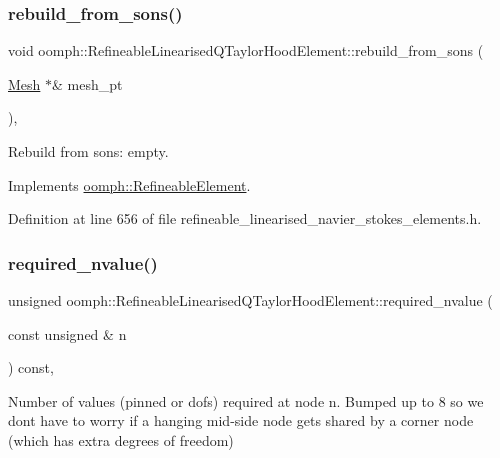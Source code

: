 \subsubsection{\texorpdfstring{rebuild\+\_\+from\+\_\+sons()}{rebuild\_from\_sons()}}
{\footnotesize\ttfamily void oomph\+::\+Refineable\+Linearised\+Q\+Taylor\+Hood\+Element\+::rebuild\+\_\+from\+\_\+sons (\begin{DoxyParamCaption}\item[{\hyperlink{classoomph_1_1Mesh}{Mesh} $\ast$\&}]{mesh\+\_\+pt }\end{DoxyParamCaption})\hspace{0.3cm}{\ttfamily [inline]}, {\ttfamily [virtual]}}



Rebuild from sons\+: empty. 



Implements \hyperlink{classoomph_1_1RefineableElement_a33324be27833fa4b78279d17158215fa}{oomph\+::\+Refineable\+Element}.



Definition at line 656 of file refineable\+\_\+linearised\+\_\+navier\+\_\+stokes\+\_\+elements.\+h.

\mbox{\label{classoomph_1_1RefineableLinearisedQTaylorHoodElement_a16716cc6af73490d9e2577dd090ac587}} 
\subsubsection{\texorpdfstring{required\+\_\+nvalue()}{required\_nvalue()}}
{\footnotesize\ttfamily unsigned oomph\+::\+Refineable\+Linearised\+Q\+Taylor\+Hood\+Element\+::required\+\_\+nvalue (\begin{DoxyParamCaption}\item[{const unsigned \&}]{n }\end{DoxyParamCaption}) const\hspace{0.3cm}{\ttfamily [inline]}, {\ttfamily [virtual]}}



Number of values (pinned or dofs) required at node n. Bumped up to 8 so we don\textquotesingle{}t have to worry if a hanging mid-\/side node gets shared by a corner node (which has extra degrees of freedom) 



